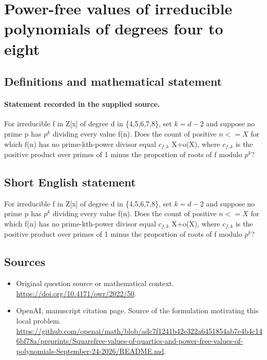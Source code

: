 \documentclass[11pt]{article}
\begin{document}
\section*{Power-free values of irreducible polynomials of degrees four to eight}\label{30007274}
\subsection{Definitions and mathematical statement}
\paragraph{Statement recorded in the supplied source.}
For irreducible f in Z[x] of degree d in \{4,5,6,7,8\}, set $k=d-2$ and suppose no prime p has $p^k$ dividing every value f(n). Does the count of positive $n<=X$ for which f(n) has no prime-kth-power divisor equal $c_{f,k}$ X+o(X), where $c_{f,k}$ is the positive product over primes of 1 minus the proportion of roots of f modulo $p^k$?
\subsection{Short English statement}
For irreducible f in Z[x] of degree d in \{4,5,6,7,8\}, set $k=d-2$ and suppose no prime p has $p^k$ dividing every value f(n). Does the count of positive $n<=X$ for which f(n) has no prime-kth-power divisor equal $c_{f,k}$ X+o(X), where $c_{f,k}$ is the positive product over primes of 1 minus the proportion of roots of f modulo $p^k$?
\subsection{Sources}
\begin{itemize}
\item[S1] Original question source or mathematical context.
\url{https://doi.org/10.4171/owr/2022/50}.
\item[S2] OpenAI, manuscript citation page. Source of the formulation motivating this local problem.
\url{https://github.com/openai/math/blob/adc7f1241b42e322a6451854ab7e4b4c146bf78a/preprints/Squarefree-values-of-quartics-and-power-free-values-of-polynomials-September-24-2026/README.md}.
\end{itemize}
\end{document}
